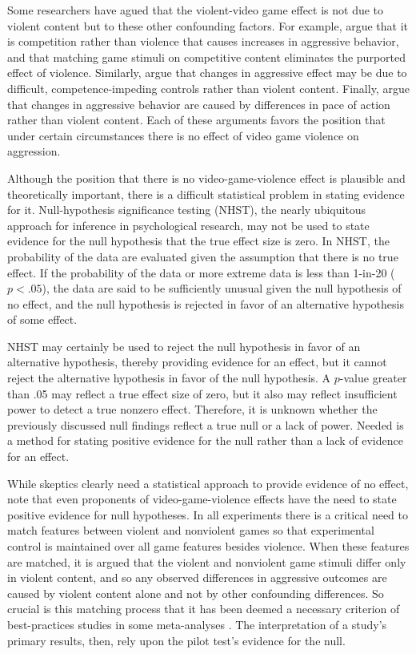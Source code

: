 \documentclass[man]{apa6}
\begin{document}
Some researchers have agued that the violent-video game effect is not due to violent content but to these other confounding factors.  For example, \citet{Adachi:Willoughby:2011} argue that it is competition rather than violence that causes increases in aggressive behavior, and that matching game stimuli on competitive content eliminates the purported effect of violence. Similarly, \citet{Przybylski:etal:2014} argue that changes in aggressive effect may be due to difficult, competence-impeding controls rather than violent content. Finally,  \citet{Elson:etal:2013} argue that changes in aggressive behavior are caused by differences in pace of action rather than violent content. Each of these arguments favors the position that under certain circumstances there is no effect of video game violence on aggression.

Although the position that there is no video-game-violence effect is plausible and theoretically important, there is a difficult statistical problem in stating evidence for it. Null-hypothesis significance testing (NHST), the nearly ubiquitous approach for inference in psychological research, may not be used to state evidence for the null hypothesis that the true effect size is zero.  In NHST, the probability of the data are evaluated given the assumption that there is no true effect. If the probability of the data or more extreme data is less than 1-in-20 ($p<.05$), the data are said to be sufficiently unusual given the null hypothesis of no effect, and the null hypothesis is rejected in favor of an alternative hypothesis of some effect.

NHST may certainly be used to reject the null hypothesis in favor of an alternative hypothesis, thereby providing evidence for an effect, but it cannot reject the alternative hypothesis in favor of the null hypothesis. A $p$-value greater than .05 may reflect a true effect size of zero, but it also may reflect insufficient power to detect a true nonzero effect. Therefore, it is unknown whether the previously discussed null findings reflect a true null or a lack of power.  Needed is a method for stating positive evidence for the null rather than a lack of evidence for an effect. %

While skeptics clearly need a statistical approach to provide evidence of no effect, note that even proponents of video-game-violence effects have the need to state positive evidence for null hypotheses.  In all experiments there is a critical need to match features between violent and nonviolent games so that experimental control is maintained over all game features besides violence.  When these features are matched, it is argued that the violent and nonviolent game stimuli differ only in violent content, and so any observed differences in aggressive outcomes are caused by violent content alone and not by other confounding differences.  So crucial is this matching process that it has been deemed a necessary criterion of best-practices studies in some meta-analyses \citep{Anderson:etal:2010}. The interpretation of a study's primary results, then, rely upon the pilot test's evidence for the null. 
\end{document}

